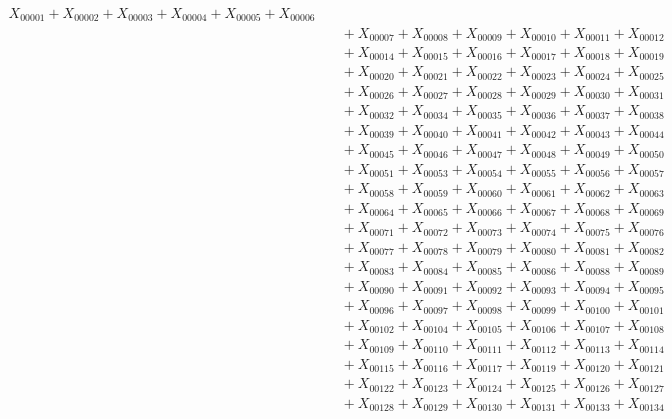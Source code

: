 \documentclass[a4paper,10pt]{article}
\begin{document}
{\begin{align}
X_{00001} + X_{00002} + X_{00003} + X_{00004} + X_{00005} + X_{00006} \\[0.5ex]
&\quad  + X_{00007} + X_{00008} + X_{00009} + X_{00010} + X_{00011} + X_{00012} \\[0.5ex]
&\quad  + X_{00014} + X_{00015} + X_{00016} + X_{00017} + X_{00018} + X_{00019} \\[0.5ex]
&\quad  + X_{00020} + X_{00021} + X_{00022} + X_{00023} + X_{00024} + X_{00025} \\[0.5ex]
&\quad  + X_{00026} + X_{00027} + X_{00028} + X_{00029} + X_{00030} + X_{00031} \\[0.5ex]
&\quad  + X_{00032} + X_{00034} + X_{00035} + X_{00036} + X_{00037} + X_{00038} \\[0.5ex]
&\quad  + X_{00039} + X_{00040} + X_{00041} + X_{00042} + X_{00043} + X_{00044} \\[0.5ex]
&\quad  + X_{00045} + X_{00046} + X_{00047} + X_{00048} + X_{00049} + X_{00050} \\[0.5ex]
&\quad  + X_{00051} + X_{00053} + X_{00054} + X_{00055} + X_{00056} + X_{00057} \\[0.5ex]
&\quad  + X_{00058} + X_{00059} + X_{00060} + X_{00061} + X_{00062} + X_{00063} \\[0.5ex]
&\quad  + X_{00064} + X_{00065} + X_{00066} + X_{00067} + X_{00068} + X_{00069} \\[0.5ex]
&\quad  + X_{00071} + X_{00072} + X_{00073} + X_{00074} + X_{00075} + X_{00076} \\[0.5ex]
&\quad  + X_{00077} + X_{00078} + X_{00079} + X_{00080} + X_{00081} + X_{00082} \\[0.5ex]
&\quad  + X_{00083} + X_{00084} + X_{00085} + X_{00086} + X_{00088} + X_{00089} \\[0.5ex]
&\quad  + X_{00090} + X_{00091} + X_{00092} + X_{00093} + X_{00094} + X_{00095} \\[0.5ex]
&\quad  + X_{00096} + X_{00097} + X_{00098} + X_{00099} + X_{00100} + X_{00101} \\[0.5ex]
&\quad  + X_{00102} + X_{00104} + X_{00105} + X_{00106} + X_{00107} + X_{00108} \\[0.5ex]
&\quad  + X_{00109} + X_{00110} + X_{00111} + X_{00112} + X_{00113} + X_{00114} \\[0.5ex]
&\quad  + X_{00115} + X_{00116} + X_{00117} + X_{00119} + X_{00120} + X_{00121} \\[0.5ex]
&\quad  + X_{00122} + X_{00123} + X_{00124} + X_{00125} + X_{00126} + X_{00127} \\[0.5ex]
&\quad  + X_{00128} + X_{00129} + X_{00130} + X_{00131} + X_{00133} + X_{00134} \\[0.5ex]

\end{align}}
\end{document}
